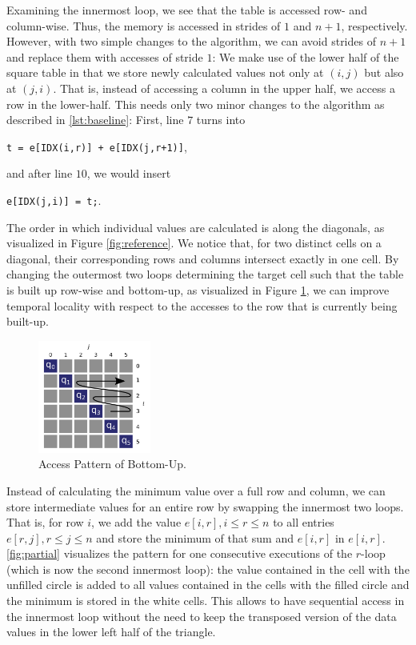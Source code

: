  Examining the innermost loop, we see that the table is
accessed row- and column-wise. Thus, the memory is accessed in strides of $1$
and $n+1$, respectively. However, with two simple changes to the algorithm, we
can avoid strides of $n+1$ and replace them with accesses of stride $1$: We make
use of the lower half of the square table in that we store newly calculated
values not only at $(i,j)$ but also at $(j,i)$. That is, instead of accessing a
column in the upper half, we access a row in the lower-half. This needs only two
minor changes to the algorithm as described in \autoref{lst:baseline}:
First, line $7$ turns into
\begin{center}
\verb:t = e[IDX(i,r)] + e[IDX(j,r+1)]:, 
\end{center}
and after line $10$, we would insert 
\begin{center}
	\verb:e[IDX(j,i)] = t;:.
\end{center}

 The order in which individual values are calculated is
along the diagonals, as visualized in Figure \ref{fig:reference}. We notice
that, for two distinct cells on a diagonal, their corresponding rows and
columns intersect exactly in one cell. By changing the outermost two loops
determining the target cell such that the table is built up row-wise and
bottom-up, as visualized in Figure \ref{fig:bottom-up}, we can improve
temporal locality with respect to the accesses to the row that is currently
being built-up.

\begin{figure}[htb]\centering
	\includegraphics[width=0.33\textwidth]{img/bottom_up_access.png}
  \caption{Access Pattern of Bottom-Up.\label{fig:bottom-up}}
\end{figure}

 Instead of calculating the minimum value over a full row
and column, we can store intermediate values for an entire row by swapping the
innermost two loops. That is, for row $i$, we add the value $e[i,r], i\leq r\leq
n$ to all entries $e[r,j], r\leq j \leq n$ and store the minimum of that sum and
$e[i,r]$ in $e[i,r]$. \autoref{fig:partial} visualizes the pattern for one
consecutive executions of the $r$-loop (which is now the second innermost loop):
the value contained in the cell with the unfilled circle is added to all values
contained in the cells with the filled circle and the minimum is stored in the
white cells. This allows to have sequential access in the innermost loop
without the need to keep the transposed version of the data values in the
lower left half of the triangle.


